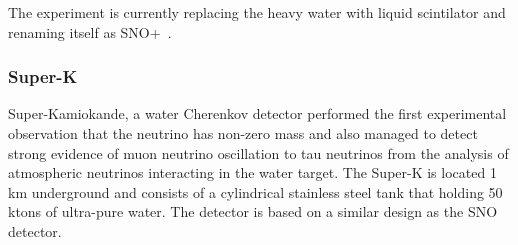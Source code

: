 The experiment is currently replacing the heavy water with liquid scintilator and renaming itself as SNO+~\cite{42SNO+}.

\subsubsection{Super-K}
Super-Kamiokande\cite{20SUPERK}, a water Cherenkov detector performed the first experimental observation that the neutrino has non-zero mass\cite{10Fukuda} and also managed to detect strong evidence of muon neutrino oscillation to tau neutrinos from the analysis of atmospheric neutrinos interacting in the water target. The Super-K is located 1 km underground and consists of a cylindrical stainless steel tank that holding 50 ktons of ultra-pure water. The detector is based on a similar design as the SNO detector. 

